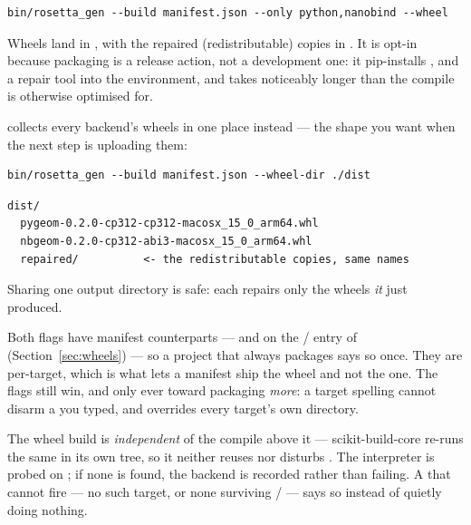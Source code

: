 \begin{lstlisting}[style=sh]
bin/rosetta_gen --build manifest.json --only python,nanobind --wheel
\end{lstlisting}

Wheels land in , with the repaired
(redistributable) copies in . It is opt-in because
packaging is a release action, not a development one: it pip-installs
,  and a repair tool into the environment,
and takes noticeably longer than the compile  is otherwise
optimised for.

 collects every backend's wheels in one place instead --- the
shape you want when the next step is uploading them:

\begin{lstlisting}[style=sh]
bin/rosetta_gen --build manifest.json --wheel-dir ./dist
\end{lstlisting}

\begin{lstlisting}[style=plain]
dist/
  pygeom-0.2.0-cp312-cp312-macosx_15_0_arm64.whl
  nbgeom-0.2.0-cp312-abi3-macosx_15_0_arm64.whl
  repaired/          <- the redistributable copies, same names
\end{lstlisting}

Sharing one output directory is safe: each  repairs only
the wheels \emph{it} just produced.

Both flags have manifest counterparts ---  and
 on the  /  entry of
 (Section~\ref{sec:wheels}) --- so a project that always
packages says so once. They are per-target, which is what lets a manifest ship
the  wheel and not the  one. The flags still win,
and only ever toward packaging \emph{more}: a target spelling
 cannot disarm a  you typed, and
 overrides every target's own directory.

\begin{note}
The wheel build is \emph{independent} of the compile above it ---
scikit-build-core re-runs the same  in its own tree, so it
neither reuses nor disturbs . The interpreter is probed on
; if none is found, the backend is recorded
 rather than failing. A
 that cannot fire --- no such target, or none surviving
/ --- says so instead of quietly doing nothing.
\end{note}

